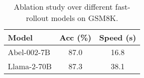 \begin{table}[!htb]
    \centering
    \begin{tabular}{l|c|c}
        Model               & Acc (\%) & Speed (s) \\
        \hline
        Abel-002-7B         & 87.0     & 16.8      \\
        Llama-2-70B         & 87.3     & 38.1      \\
        \hline
    \end{tabular}
    \vspace{4mm}
    \caption{Ablation study over different fast-rollout models on GSM8K.}
    \label{table:ablation_fr}
\end{table}